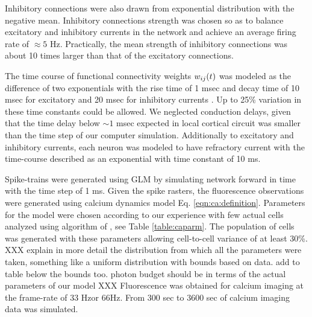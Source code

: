 Inhibitory connections were also drawn from exponential distribution with the negative mean. Inhibitory connections strength was chosen so as to balance excitatory and inhibitory currents in the network and achieve an average firing rate of  $\approx 5 $ Hz. Practically, the mean strength of inhibitory connections was about 10 times larger than that of the excitatory connections. 

The time course of functional connectivity weights $w_{ij}(t)$ was modeled as the difference of two exponentials with the rise time of 1 msec and decay time of 10 msec for excitatory and 20 msec for inhibitory currents \cite{Sayer1990}. Up to 25\% variation in these time constants could be allowed. We neglected conduction delays, given that the time delay below $\sim 1$ msec expected in local cortical circuit was smaller than the time step of our computer simulation.  Additionally to excitatory and inhibitory currents, each neuron was modeled to have refractory current with the time-course described as an exponential with time constant of 10 ms.

Spike-trains were generated using GLM by simulating network forward in time with the time step of 1 ms.  Given the spike rasters, the fluorescence observations were generated using calcium dynamics model Eq. \eqref{eqn:ca:definition}. Parameters for the model were chosen according to our experience with few actual cells analyzed using algorithm of \cite{Vogelstein2009}, see Table \ref{table:caparm}.  The population of cells was generated with these parameters allowing cell-to-cell variance of at least 30\%. XXX explain in more detail the distribution from which all the parameters were taken, something like a uniform distribution with bounds based on data.  add to table below the bounds too.  photon budget should be in terms of the actual parameters of our model XXX Fluorescence was obtained for calcium imaging at the frame-rate of 33 Hzor 66Hz.  From 300 sec to 3600 sec of calcium imaging data was simulated.

